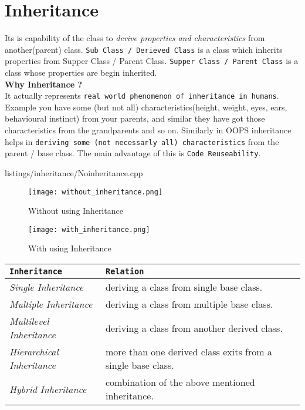 \documentclass[oops.tex]{subfiles}
\begin{document}
\section{Inheritance}

Its is capability of the class to \emph{derive properties and characteristics} 
from another(parent) class. \texttt{Sub Class / Derieved Class} is a class which 
inherits properties from Supper Class / Parent Class. \texttt{Supper Class /
Parent Class} is a class whose properties are begin inherited.\\

{\bf Why Inheritance ?}\\
It actually represents \texttt{real world phenomenon of inheritance in humans}.
Example you have some (but not all) characteristics(height, weight, eyes, ears, 
behavioural instinct) from your parents, and similar they have got those
characteristics from the grandparents and so on. Similarly in OOPS inheritance
helps in \texttt{deriving some (not necessarly all) characteristics} from the
parent / base class. The main advantage of this is \texttt{Code Reuseability}.


{listings/inheritance/Noinheritance.cpp}

\begin{figure}[h]
    \begin{center}
        \caption{Without using Inheritance}
        \texttt{[image: without\_inheritance.png]}
    \end{center}
\end{figure}

\begin{figure}[h]
    \begin{center}
        \caption{With using Inheritance}
        \texttt{[image: with\_inheritance.png]}
    \end{center}
\end{figure}

\begin{center}
    \begin{tabular}{l | l}
        \texttt{Inheritance}            & \texttt{Relation}\\
        \hline
        \emph{Single Inheritance}       & deriving a class from single base class.\\
        \emph{Multiple Inheritance}     & deriving a class from multiple base class.\\
        \emph{Multilevel Inheritance}   & deriving a class from another derived class.\\
        \emph{Hierarchical Inheritance} & more than one derived class exits from a single base class.\\
        \emph{Hybrid Inheritance}       & combination of the above mentioned inheritance.\\
    \end{tabular}
\end{center}
\end{document}
